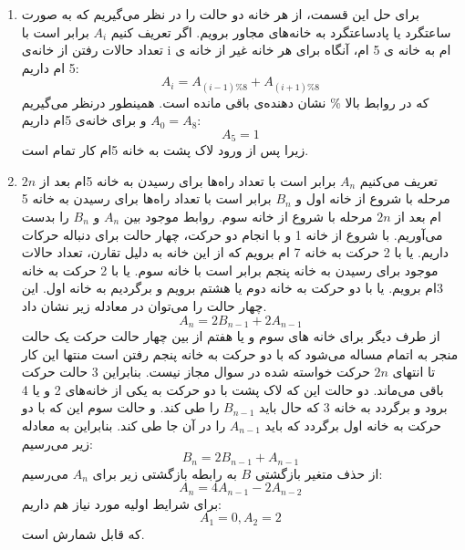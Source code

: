 \p
\begin{enumerate}
    \item
    برای حل این قسمت، از هر خانه دو حالت را در نظر می‌گیریم که به صورت ساعتگرد یا پادساعتگرد به خانه‌های مجاور برویم. اگر تعریف کنیم \(A_i\) برابر است با تعداد حالات رفتن از خانه‌ی i ام به خانه ی 5 ام، آنگاه برای هر خانه غیر از خانه ی 5 ام داریم:
    \[ A_i=A_{(i-1)\%8} + A_{(i+1)\%8}\]که در روابط بالا \% نشان دهنده‌ی باقی مانده است. همینطور درنظر می‌گیریم \(A_0=A_8\) و برای خانه‌ی 5ام داریم:
    \[A_5 = 1\]زیرا پس از ورود لاک پشت به خانه 5ام کار تمام است.
    
    \item
    \p
      تعریف می‌کنیم \(A_n\) برابر است با تعداد راه‌ها برای رسیدن به خانه 5ام بعد از 
      $2n $
      مرحله با شروع از خانه اول و \(B_n\) برابر است با تعداد راه‌ها برای رسیدن به خانه 5 ام بعد از 
      $2n$
       مرحله با شروع از خانه سوم. روابط موجود بین \(A_n\) و \(B_n\) را بدست می‌آوریم. با شروع از خانه 1 و با انجام دو حرکت، چهار حالت برای دنباله حرکات داریم. یا با 2 حرکت به خانه 7 ام برویم که از این خانه به دلیل تقارن، تعداد حالات موجود برای رسیدن به خانه پنجم برابر است با خانه سوم. یا با 2 حرکت به خانه 3ام برویم. یا با دو حرکت به خانه دوم یا هشتم برویم و برگردیم به خانه اول. این چهار حالت را می‌توان در معادله زیر نشان داد.
\[ A_n=2B_{n-1}+2A_{n-1} \]از طرف دیگر برای خانه های سوم و یا هفتم از بین چهار حالت حرکت یک حالت منجر به اتمام مساله می‌شود که با دو حرکت به خانه پنجم رفتن است منتها این کار تا انتهای
$2n$
 حرکت خواسته شده در سوال مجاز نیست. بنابراین 3 حالت حرکت باقی می‌ماند. دو حالت این که لاک پشت با دو حرکت به یکی از خانه‌های 2 و یا 4 برود و برگردد به خانه 3 که حال باید \(B_{n-1}\) را طی کند. و حالت سوم این که با دو حرکت به خانه اول برگردد که باید \(A_{n-1}\) را در آن جا طی کند. بنابراین به معادله زیر می‌رسیم:
\[ B_n = 2 B_{n-1}+A_{n-1} \]از حذف متغیر بازگشتی 
$B$
به رابطه بازگشتی زیر برای \(A_n\) می‌رسیم:
\[ A_n=4A_{n-1} - 2A_{n-2} \]
برای شرایط اولیه مورد نیاز هم داریم:
\[ A_1 = 0, A_2 = 2 \]که قابل شمارش است.
\end{enumerate}